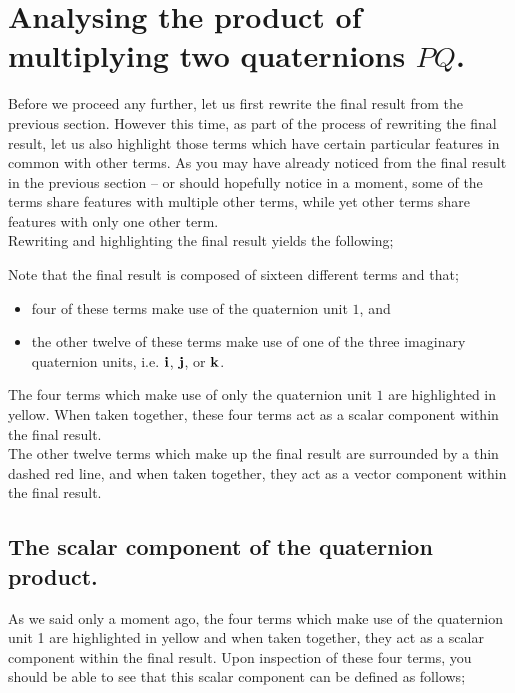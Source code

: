 \chapter{Analysing the product of multiplying two quaternions \(PQ\).}

Before we proceed any further, let us first rewrite the final result from the previous section. However this time, as
part of the process of rewriting the final result, let us also highlight those terms which have certain particular
features in common with other terms. As you may have already noticed from the final result in the previous section --
or should hopefully notice in a moment, some of the terms share features with multiple other terms, while yet other
terms share features with only one other term.\\

Rewriting and highlighting the final result yields the following;



Note that the final result is composed of sixteen different terms and that;

\begin{itemize}
    \item four of these terms make use of the quaternion unit \(1\), and
    \item the other twelve of these terms make use of one of the three imaginary quaternion units, i.e. \(\bm{\mathrm{i}}\),
          \(\bm{\mathrm{j}}\), or
          \(\bm{\mathrm{k}}\).
\end{itemize}
\vspace{0\baselineskip}

The four terms which make use of only the quaternion unit \(1\) are highlighted in yellow. When taken together, these
four terms act as a scalar component within the final result.\\

The other twelve terms which make up the final result are surrounded by a thin dashed red line, and when taken together,
they act as a vector component within the final result.


\section{The scalar component of the quaternion product.}

As we said only a moment ago, the four terms which make use of the quaternion unit 1 are highlighted in yellow and when
taken together, they act as a scalar component within the final result. Upon inspection of these four terms, you should
be able to see that this scalar component can be defined as follows;

